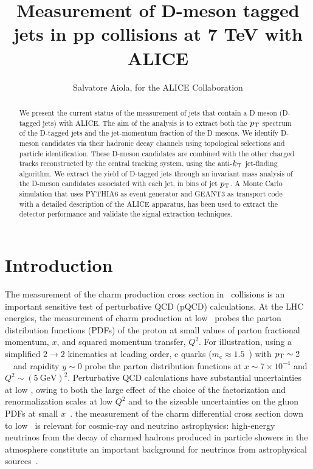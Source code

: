 \documentclass[a4paper]{jpconf}
\begin{document}
\title{Measurement of D-meson tagged jets in pp collisions at 7 TeV with ALICE}

\author{Salvatore Aiola, for the ALICE Collaboration}

\address{Physics Department, Yale University, 266 Whitney Avenue, New Haven, CT 06511}


\begin{abstract}
We present the current status of the measurement of jets that contain a D meson (D-tagged jets) with \mbox{ALICE}.
The aim of the analysis is to extract both the $p_{\rm T}$ spectrum of the D-tagged jets and the jet-momentum fraction of the D mesons. 
We identify D-meson candidates via their hadronic decay channels using topological selections and particle identification.
These D-meson candidates are combined with the other charged tracks reconstructed by the central tracking system, 
using the anti-$k_{\rm T}$ jet-finding algorithm.
We extract the yield of D-tagged jets through an invariant mass analysis of the D-meson candidates associated with each jet, 
in bins of jet $p_{\rm T}$.
A Monte Carlo simulation that uses PYTHIA6 as event generator and GEANT3 as transport code with a detailed description of the ALICE apparatus,
has been used to extract the detector performance and validate the signal extraction techniques.
\end{abstract}

\section{Introduction}
The measurement of the charm production cross section in \pp\ collisions is an important sensitive test of perturbative QCD (pQCD) calculations.
At the LHC energies, the measurement of charm production at low \pT\ probes the parton distribution functions (PDFs)
of the proton at small values of parton fractional momentum, $x$, and squared momentum transfer, $Q^2$.
For illustration, using a simplified $2 \rightarrow 2$ kinematics at leading order, c quarks ($m_{\mathrm{c}} \approx 1.5$~\GeVcsq) with
$p_{\rm T} \sim 2$~\GeVc\ and rapidity $y \sim 0$ probe the parton distribution functions at $x \sim 7 \times 10^{-4}$ and
$Q^2 \sim (5~\mathrm{GeV})^2$.
Perturbative QCD calculations have substantial uncertainties at low \pT, owing to both the large effect of the
choice of the factorization and renormalization scales at low $Q^2$ and to the sizeable uncertainties on the
gluon PDFs at small $x$~\cite{Cacciari:2015}. 
the measurement of the charm differential cross section down to low \pT\ is relevant for cosmic-ray and neutrino
astrophysics: high-energy neutrinos from the decay of charmed hadrons produced in particle showers in the atmosphere constitute an important
background for neutrinos from astrophysical sources~\cite{Gauld:2015, Bhattacharya:2015}.
\end{document}
